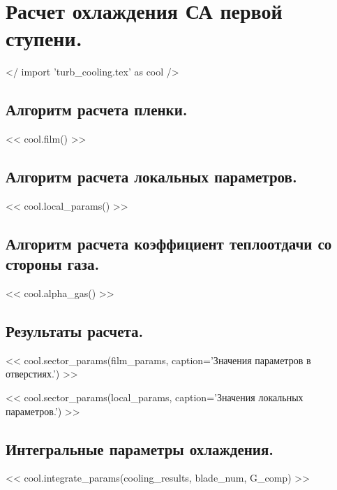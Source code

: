 \documentclass[a4paper,10pt]{article}
\begin{document}
\section{Расчет охлаждения СА первой ступени.}

    </ import 'turb_cooling.tex' as cool />

    \subsection{Алгоритм расчета пленки.}

    << cool.film() >>

    \subsection{Алгоритм расчета локальных параметров.}

    << cool.local_params() >>

    \subsection{Алгоритм расчета коэффициент теплоотдачи со стороны газа.}

    << cool.alpha_gas() >>

    \subsection{Результаты расчета.}

    << cool.sector_params(film_params, caption='Значения параметров в отверстиях.') >>

    << cool.sector_params(local_params, caption='Значения локальных параметров.') >>

    \subsection{Интегральные параметры охлаждения.}

    << cool.integrate_params(cooling_results, blade_num, G_comp) >>
\end{document}
